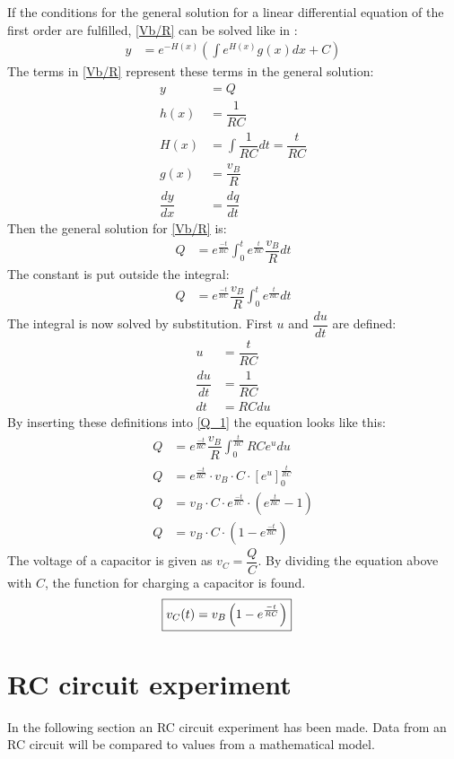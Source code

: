If the conditions for the general solution for a linear differential equation of the first order are fulfilled, \eqref{Vb/R} can be solved like in :
\begin{align*}
y&=e^{-H(x)}\left(\int e^{H(x)}g(x)dx+C\right)
\end{align*}
The terms in \eqref{Vb/R} represent these terms in the general solution:
\begin{align*}
y &= Q
\\
h(x) &= \dfrac{1}{RC}
\\
H(x) &= \int \dfrac{1}{RC}dt=\dfrac{t}{RC}
\\
g(x) &= \dfrac{v_B}{R}
\\
\dfrac{dy}{dx} &= \dfrac{dq}{dt}
\end{align*}
Then the general solution for \eqref{Vb/R} is:
\begin{align*}
Q&= e^{\frac{-t}{RC}}\int_{0}^{t}e^{\frac{t}{RC}}\dfrac{v_B}{R}dt
\end{align*}
The constant is put outside the integral:
\begin{align}
Q&= e^{\frac{-t}{RC}}\dfrac{v_B}{R}\int_{0}^{t}e^{\frac{t}{RC}}dt \label{Q_1}
\end{align}
The integral is now solved by substitution. First $u$ and $\dfrac{du}{dt}$ are defined:
\begin{align*}
u &= \dfrac{t}{RC}
\\
\dfrac{du}{dt}&=\dfrac{1}{RC}
\\
dt &=RC du
\end{align*} 
By inserting these definitions into \eqref{Q_1} the equation looks like this:
\begin{align*}
Q &= e^{\frac{-t}{RC}}\dfrac{v_B}{R}\int_{0}^{\frac{t}{RC}}RCe^u du
\\
Q &= e^{\frac{-t}{RC}}\cdot v_B\cdot C\cdot \left[e^u\right]_{0}^{\frac{t}{RC}}
\\
Q &= v_B \cdot C\cdot e^{\frac{-t}{RC}}\cdot\left(e^{\frac{t}{RC}}-1\right)
\\
Q &= v_B \cdot C \cdot \left(1-e^{\frac{-t}{RC}}\right)
\end{align*} 
The voltage of a capacitor is given as $v_C=\dfrac{Q}{C}$. By dividing the equation above with $C$, the function for charging a capacitor is found.
\begin{align}
\label{V_up}
\Aboxed{
v_C(t)=v_B\left(1-e^{\frac{-t}{RC}}\right)
}
\end{align}
\section{RC circuit experiment}
In the following section an RC circuit experiment has been made. Data from an RC circuit will be compared to values from a mathematical model.


